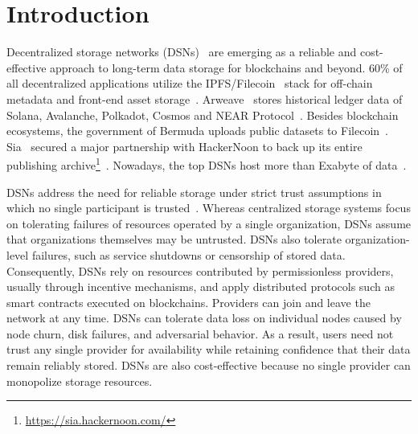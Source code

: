 \section{Introduction}
\label{sec:intro}

Decentralized storage networks (DSNs)~\cite{filecoin,sia,shelby,permacoin,retricoin,arweave,walrus,bft-dsn,swarm} are emerging as a reliable and cost-effective approach to long-term data storage for blockchains and beyond.
60\% of all decentralized applications utilize the IPFS/Filecoin~\cite{filecoin} stack for off-chain metadata and front-end asset storage~\cite{filecoin-web3}.
Arweave~\cite{arweave} stores historical ledger data of Solana, Avalanche, Polkadot, Cosmos and NEAR Protocol~\cite{arweave-solana,arweave-blockchains}.
Besides blockchain ecosystems, the government of Bermuda uploads public datasets to Filecoin~\cite{filecoin-bermuda}.
Sia~\cite{sia} secured a major partnership with HackerNoon to back up its entire publishing archive\footnote{\url{https://sia.hackernoon.com/}}~\cite{sia-hackermoon}.
Nowadays, the top DSNs host more than Exabyte of data~\cite{filecoin-size}.

DSNs address the need for reliable storage under strict trust assumptions in which no single participant is trusted~\cite{bar}.
Whereas centralized storage systems focus on tolerating failures of resources operated by a single organization, DSNs assume that organizations themselves may be untrusted.
DSNs also tolerate organization-level failures, such as service shutdowns or censorship of stored data.
Consequently, DSNs rely on resources contributed by permissionless providers, usually through incentive mechanisms, and apply distributed protocols such as smart contracts executed on blockchains.
Providers can join and leave the network at any time.
DSNs can tolerate data loss on individual nodes caused by node churn, disk failures, and adversarial behavior.
As a result, users need not trust any single provider for availability while retaining confidence that their data remain reliably stored.
DSNs are also cost-effective because no single provider can monopolize storage resources.

